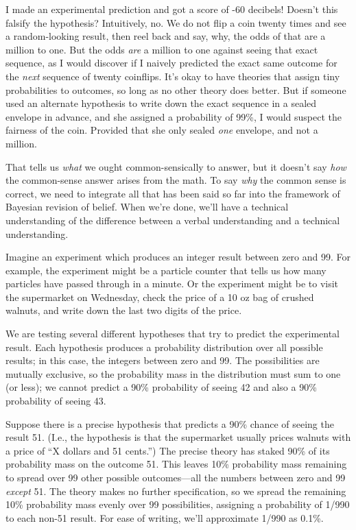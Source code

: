 {
 I made an experimental prediction and got a score of -60 decibels!
Doesn't this falsify the hypothesis? Intuitively, no.
We do not flip a coin twenty times and see a random-looking result,
then reel back and say, why, the odds of that are a million to one. But
the odds \textit{are} a million to one against seeing that exact
sequence, as I would discover if I naively predicted the exact same
outcome for the \textit{next} sequence of twenty coinflips.
It's okay to have theories that assign tiny
probabilities to outcomes, so long as no other theory does better. But
if someone used an alternate hypothesis to write down the exact
sequence in a sealed envelope in advance, and she assigned a
probability of 99\%, I would suspect the fairness of the coin. Provided
that she only sealed \textit{one} envelope, and not a million.}

{
 That tells us \textit{what} we ought common-sensically to answer,
but it doesn't say \textit{how} the common-sense answer
arises from the math. To say \textit{why} the common sense is correct,
we need to integrate all that has been said so far into the framework
of Bayesian revision of belief. When we're done,
we'll have a technical understanding of the difference
between a verbal understanding and a technical understanding.}

{
 Imagine an experiment which produces an integer result between
zero and 99. For example, the experiment might be a particle counter
that tells us how many particles have passed through in a minute. Or
the experiment might be to visit the supermarket on Wednesday, check
the price of a 10 oz bag of crushed walnuts, and write down the last
two digits of the price.}

{
 We are testing several different hypotheses that try to predict
the experimental result. Each hypothesis produces a probability
distribution over all possible results; in this case, the integers
between zero and 99. The possibilities are mutually exclusive, so the
probability mass in the distribution must sum to one (or less); we
cannot predict a 90\% probability of seeing 42 and also a 90\%
probability of seeing 43.}

{
 Suppose there is a precise hypothesis that predicts a 90\% chance
of seeing the result 51. (I.e., the hypothesis is that the supermarket
usually prices walnuts with a price of ``X dollars and
51 cents.'') The precise theory has staked 90\% of
its probability mass on the outcome 51. This leaves 10\% probability
mass remaining to spread over 99 other possible outcomes---all the
numbers between zero and 99 \textit{except} 51. The theory makes no
further specification, so we spread the remaining 10\% probability mass
evenly over 99 possibilities, assigning a probability of 1/990 to each
non-51 result. For ease of writing, we'll approximate
1/990 as 0.1\%.}

